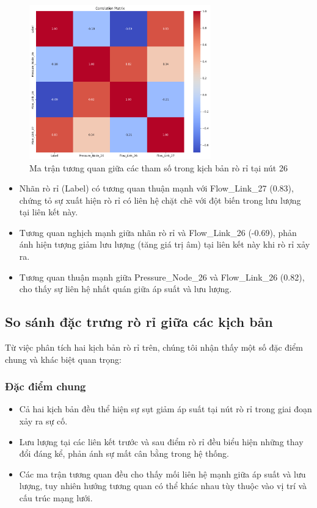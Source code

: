 \begin{figure}[H]
    \centering
    \includegraphics[width=0.7\textwidth]{image/section5_1/scenario316_corr.png}
    \caption{Ma trận tương quan giữa các tham số trong kịch bản rò rỉ tại nút 26}
    \label{fig:scenario316_corr}
\end{figure}

\begin{itemize}
    \item Nhãn rò rỉ (Label) có tương quan thuận mạnh với Flow\_Link\_27 (0.83), chứng tỏ sự xuất hiện rò rỉ có liên hệ chặt chẽ với đột biến trong lưu lượng tại liên kết này.
    \item Tương quan nghịch mạnh giữa nhãn rò rỉ và Flow\_Link\_26 (-0.69), phản ánh hiện tượng giảm lưu lượng (tăng giá trị âm) tại liên kết này khi rò rỉ xảy ra.
    \item Tương quan thuận mạnh giữa Pressure\_Node\_26 và Flow\_Link\_26 (0.82), cho thấy sự liên hệ nhất quán giữa áp suất và lưu lượng.
\end{itemize}

\subsection{So sánh đặc trưng rò rỉ giữa các kịch bản}

Từ việc phân tích hai kịch bản rò rỉ trên, chúng tôi nhận thấy một số đặc điểm chung và khác biệt quan trọng:

\subsubsection{Đặc điểm chung}
\begin{itemize}
    \item Cả hai kịch bản đều thể hiện sự sụt giảm áp suất tại nút rò rỉ trong giai đoạn xảy ra sự cố.
    \item Lưu lượng tại các liên kết trước và sau điểm rò rỉ đều biểu hiện những thay đổi đáng kể, phản ánh sự mất cân bằng trong hệ thống.
    \item Các ma trận tương quan đều cho thấy mối liên hệ mạnh giữa áp suất và lưu lượng, tuy nhiên hướng tương quan có thể khác nhau tùy thuộc vào vị trí và cấu trúc mạng lưới.
\end{itemize}


